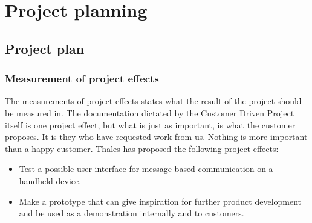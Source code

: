 \chapter{Project planning}

\section{Project plan}

\subsection{Measurement of project effects}
The measurements of project effects states what the result of the project should be measured in. The documentation dictated by the Customer Driven Project itself is one project effect, but what is just as important, is what the customer proposes. It is they who have requested work from us. Nothing is more important than a happy customer.
\newline
\newline
Thales has proposed the following project effects:
\begin{itemize}
\item{}Test a possible user interface for message-based communication on a handheld device.
\item{}Make a prototype that can give inspiration for further product development and be used as a demonstration internally and to customers.
\end{itemize}